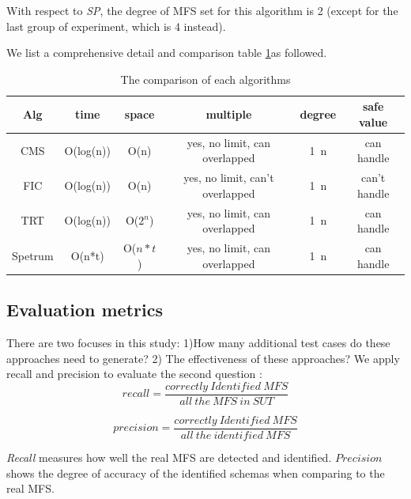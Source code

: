 \documentclass{sig-alternate-05-2015}
\begin{document}
{{With respect to \emph{SP}, the degree of MFS set for this algorithm is 2 (except for the last group of experiment, which is 4 instead).

We list a comprehensive detail and comparison table \ref{comparison-metrics}as followed.

\begin{table}\renewcommand{\arraystretch}{1.3}
  \caption{The comparison of each algorithms} \centering
  \label{comparison-metrics}
  \begin{tabular}{c|c|c|c|c|c}\hline
  \hline
  \bfseries Alg & \bfseries time  & \bfseries space & \bfseries multiple  & \bfseries degree & \bfseries safe value \\
  \hline
    CMS & O(log(n)) & O(n) & yes, no limit, can overlapped & 1~n & can handle \\
  \hline
    FIC & O(log(n)) & O(n) & yes, no limit, can't overlapped & 1~n & can't handle \\
    TRT & O(log(n)) & O($2^n$) & yes, no limit, can overlapped & 1~n & can handle  \\
    Spetrum & O(n*t) & O($n*t$) & yes, no limit, can overlapped & 1~n & can handle  \\
  \hline
  \end{tabular}

\end{table}


\subsection{Evaluation metrics}
There are two focuses in this study: 1)How many additional test cases do these approaches need to generate? 2) The effectiveness of these approaches?  We apply recall and precision to evaluate the second question :
$$recall =
 \frac{correctly\ Identified\ MFS}{all\ the\ MFS\ in\ SUT}
$$

$$precision =
 \frac{correctly\ Identified\ MFS}{all\ the\ identified\ MFS}
$$

\emph{Recall} measures how well the real MFS are detected and identified. $Precision$ shows the degree of accuracy of the identified schemas when comparing to the real MFS.

}}
\end{document}
